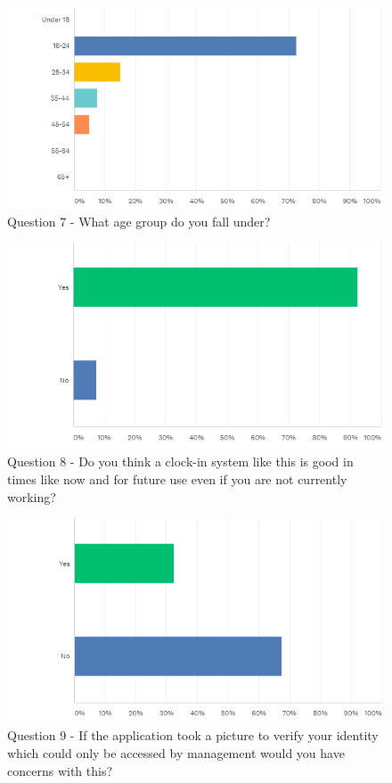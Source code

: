 \begin{figure}[h]
    \includegraphics[width=1\textwidth]{img/Q7.png}
    \caption{Question 7 - What age group do you fall under?}
    \label{fig}
\end{figure}
\begin{figure}[h]
    \includegraphics[width=1\textwidth]{img/Q8.png}
    \caption{Question 8 - Do you think a clock-in system like this is good in times like now and for future use even if you are not currently working?}
    \label{fig}
\end{figure}
\begin{figure}[h]
    \includegraphics[width=1\textwidth]{img/Q9.png}
    \caption{Question 9 - If the application took a picture to verify your identity which could only be accessed by management would you have concerns with this?}
    \label{fig}
\end{figure}
